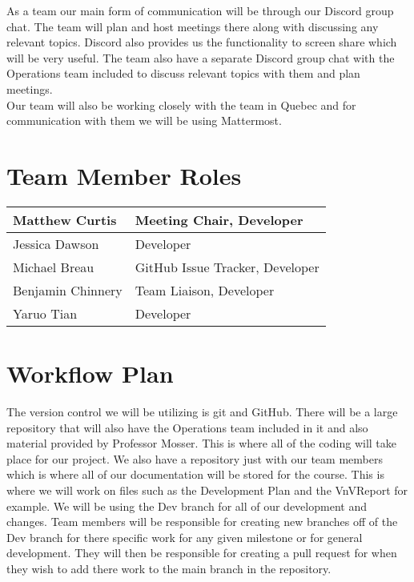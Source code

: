 \documentclass{article}
\begin{document}
As a team our main form of communication will be through our Discord group chat. The team will plan and host meetings there along with discussing any relevant topics. Discord also provides us the functionality to screen share which will be very useful. The team also have a separate Discord group chat with the Operations team included to discuss relevant topics with them and plan meetings.\\
Our team will also be working closely with the team in Quebec and for communication with them we will be using Mattermost.
\section{Team Member Roles}
\begin{center}
\begin{tabular}{ | m{3cm}| m{7cm} | } 
  \hline
  Matthew Curtis & Meeting Chair, Developer \\ 
  \hline
  Jessica Dawson & Developer \\ 
  \hline
  Michael Breau & GitHub Issue Tracker, Developer \\ 
 \hline
  Benjamin Chinnery & Team Liaison, Developer \\ 
 \hline
  Yaruo Tian & Developer \\ 
  \hline
\end{tabular}
\end{center}
\section{Workflow Plan}

The version control we will be utilizing is git and GitHub. There will be a large repository that will also have the Operations team included in it and also material provided by Professor Mosser. This is where all of the coding will take place for our project. We also have a repository just with our team members which is where all of our documentation will be stored for the course. This is where we will work on files such as the Development Plan and the VnVReport for example. We will be using the Dev branch for all of our development and changes. Team members will be responsible for creating new branches off of the Dev branch for there specific work for any given milestone or for general development. They will then be responsible for creating a pull request for when they wish to add there work to the main branch in the repository. \\
\end{document}
